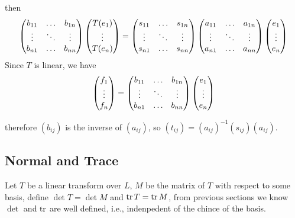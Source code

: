 then
$$
\left(\begin{matrix}
b_{11} & \hdots & b_{1n} \cr
\vdots & \ddots & \vdots \cr
b_{n1} & \hdots & b_{nn}
\end{matrix}\right)
\left(\begin{matrix}
T(e_1) \cr \vdots \cr T(e_n)
\end{matrix}\right)
=
\left(\begin{matrix}
s_{11} & \hdots & s_{1n} \cr
\vdots & \ddots & \vdots \cr
s_{n1} & \hdots & s_{nn}
\end{matrix}\right)
\left(\begin{matrix}
a_{11} & \hdots & a_{1n} \cr
\vdots & \ddots & \vdots \cr
a_{n1} & \hdots & a_{nn}
\end{matrix}\right)
\left(\begin{matrix}
e_1 \cr \vdots \cr e_n
\end{matrix}\right)
$$
Since $T$ is linear, we have
$$
\left(\begin{matrix}
f_1 \cr \vdots \cr f_n
\end{matrix}\right)
=
\left(\begin{matrix}
b_{11} & \hdots & b_{1n} \cr
\vdots & \ddots & \vdots \cr
b_{n1} & \hdots & b_{nn}
\end{matrix}\right)
\left(\begin{matrix}
e_1 \cr \vdots \cr e_n
\end{matrix}\right)
$$

therefore $(b_{ij})$ is the inverse of $(a_{ij})$,
so $(t_{ij}) = (a_{ij})^{-1}(s_{ij})(a_{ij})$.

\subsection{Normal and Trace}
Let $T$ be a linear transform over $L$, $M$ be the matrix of $T$ with respect to some basis,
define $\det T = \det M$ and $\mathop{\mathrm{tr}} T = \mathop{\mathrm{tr}} M$, from previous sections we know $\det$ and $\mathop{\mathrm{tr}}$ are
well defined, i.e., indenpedent of the chince of the basis.
